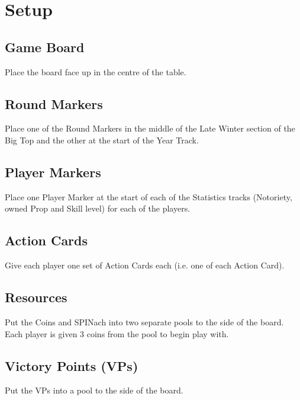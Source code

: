 \chapter{Setup}
	\section{Game Board}
Place the board face up in the centre of the table.
	\section{Round Markers}
Place one of the Round Markers in the middle of the Late Winter section of the Big Top and the other at the start of the Year Track.
	\section{Player Markers}
Place one Player Marker at the start of each of the Statistics tracks (Notoriety, owned Prop and Skill level) for each of the players.
	\section{Action Cards}
Give each player one set of Action Cards each (i.e. one of each Action Card).
	\section{Resources}
Put the Coins and SPINach into two separate pools to the side of the board.
Each player is given 3 coins from the pool to begin play with.
	\section{Victory Points (VPs)}
Put the VPs into a pool to the side of the board.

